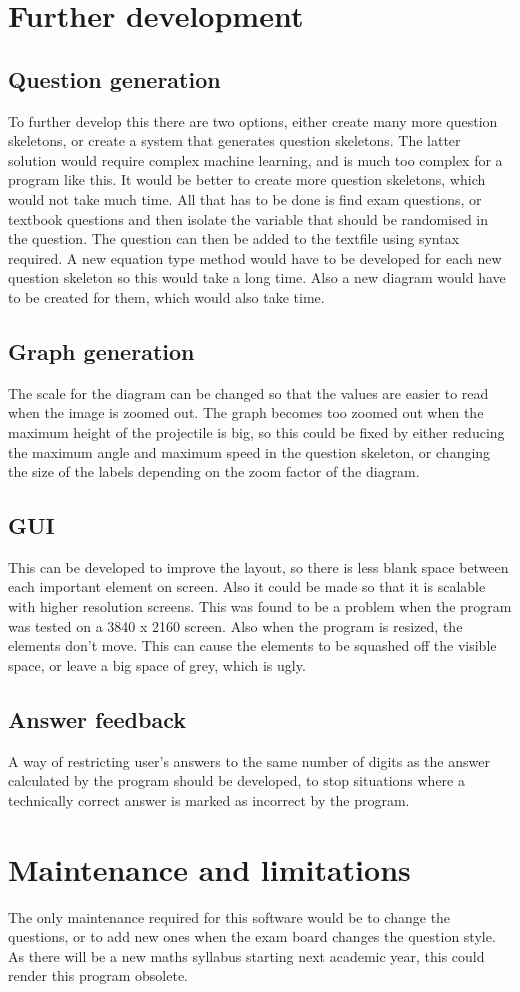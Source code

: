 \section{Further development}
\subsection{Question generation}
To further develop this there are two options, either create many more question skeletons, or create a system that generates question skeletons. The latter solution would require complex machine learning, and is much too complex for a program like this. It would be better to create more question skeletons, which would not take much time. All that has to be done is find exam questions, or textbook questions and then isolate the variable that should be randomised in the question. The question can then be added to the textfile using syntax required. A new equation type method would have to be developed for each new question skeleton so this would take a long time. Also a new diagram would have to be created for them, which would also take time.
\subsection{Graph generation}
The scale for the diagram can be changed so that the values are easier to read when the image is zoomed out. The graph becomes too zoomed out when the maximum height of the projectile is big, so this could be fixed by either reducing the maximum angle and maximum speed in the question skeleton, or changing the size of the labels depending on the zoom factor of the diagram.
\subsection{GUI}
This can be developed to improve the layout, so there is less blank space between each important element on screen. Also it could be made so that it is scalable with higher resolution screens. This was found to be a problem when the program was tested on a 3840 x 2160 screen. Also when the program is resized, the elements don't move. This can cause the elements to be squashed off the visible space, or leave a big space of grey, which is ugly.
\subsection{Answer feedback}
A way of restricting user's answers to the same number of digits as the answer calculated by the program should be developed, to stop situations where a technically correct answer is marked as incorrect by the program.
\section{Maintenance and limitations}
The only maintenance required for this software would be to change the questions, or to add new ones when the exam board changes the question style. As there will be a new maths syllabus starting next academic year, this could render this program obsolete.